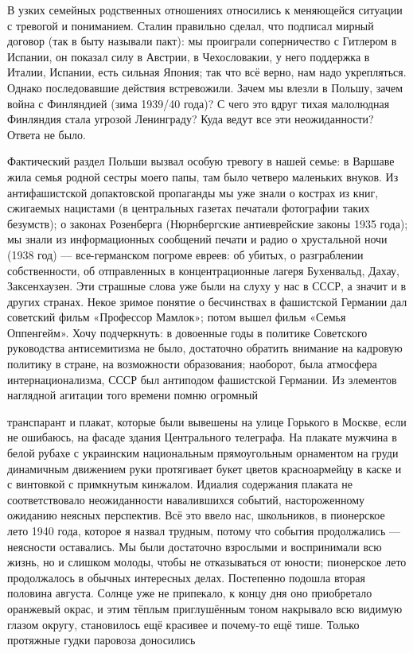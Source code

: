 \label{22-2}
В узких семейных родственных отношениях относились к меняющейся ситуации с тревогой и пониманием. %
Сталин правильно сделал, что подписал мирный договор (так в быту называли пакт): мы проиграли соперничество с Гитлером в Испании, он показал силу в Австрии, в Чехословакии, у него поддержка в Италии, Испании, есть сильная Япония; так что всё верно, нам надо укрепляться. Однако последовавшие действия встревожили. Зачем мы влезли в Польшу, зачем война с Финляндией (зима 1939/40 года)? %
С чего это вдруг тихая малолюдная Финляндия стала угрозой Ленинграду? Куда ведут все эти неожиданности? Ответа не было.

\label{23-1}
Фактический раздел Польши вызвал особую тревогу в нашей семье: в Варшаве жила семья родной сестры моего папы, там было четверо маленьких внуков. Из антифашистской допактовской пропаганды мы уже знали о кострах из книг, сжигаемых нацистами (в центральных газетах печатали фотографии таких безумств); о законах Розенберга (Нюрнбергские антиеврейские законы 1935 года); мы знали из информационных сообщений печати и радио о хрустальной ночи (1938 год) — все-германском погроме евреев: об убитых, о разграблении собственности, об отправленных в концентрационные лагеря Бухенвальд, Дахау, Заксенхаузен. Эти страшные слова уже были на слуху у нас в СССР, а значит и в других странах. Некое зримое понятие о бесчинствах в фашистской Германии дал советский фильм «Профессор Мамлок»; потом вышел фильм «Семья Оппенгейм». Хочу подчеркнуть: в довоенные годы в политике Советского руководства антисемитизма не было, достаточно обратить внимание на кадровую политику в стране, на возможности образования; наоборот, была атмосфера интернационализма, СССР был антиподом фашистской Германии. Из элементов наглядной агитации того времени помню огромный

\label{24-1}
транспарант и плакат, которые были вывешены на улице Горького в Москве, если не ошибаюсь, на фасаде здания Центрального телеграфа. На плакате мужчина в белой рубахе с украинским национальным прямоугольным орнаментом на груди динамичным движением руки протягивает букет цветов красноармейцу в каске и с винтовкой с примкнутым кинжалом. Идиалия содержания плаката не соответствовало неожиданности навалившихся событий, настороженному ожиданию неясных перспектив. Всё это ввело нас, школьников, в пионерское лето 1940 года, которое я назвал трудным, потому что события продолжались — неясности оставались. Мы были достаточно взрослыми и воспринимали всю жизнь, но и слишком молоды, чтобы не отказываться от юности; пионерское лето продолжалось в обычных интересных делах. Постепенно подошла вторая половина августа. Солнце уже не припекало, к концу дня оно приобретало оранжевый окрас, и этим тёплым приглушённым тоном накрывало всю видимую глазом округу, становилось ещё красивее и почему-то ещё тише. Только протяжные гудки паровоза доносились 

